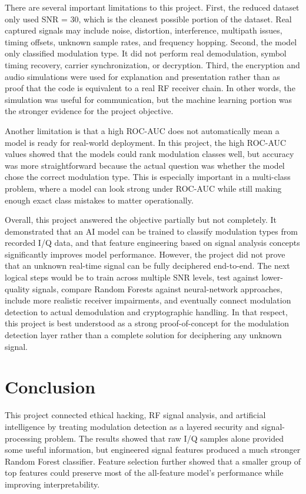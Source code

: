 \documentclass[12pt]{article}
\begin{document}
There are several important limitations to this project. First, the reduced dataset only used SNR = 30, which is the cleanest possible portion of the dataset. Real captured signals may include noise, distortion, interference, multipath issues, timing offsets, unknown sample rates, and frequency hopping. Second, the model only classified modulation type. It did not perform real demodulation, symbol timing recovery, carrier synchronization, or decryption. Third, the encryption and audio simulations were used for explanation and presentation rather than as proof that the code is equivalent to a real RF receiver chain. In other words, the simulation was useful for communication, but the machine learning portion was the stronger evidence for the project objective.

Another limitation is that a high ROC-AUC does not automatically mean a model is ready for real-world deployment. In this project, the high ROC-AUC values showed that the models could rank modulation classes well, but accuracy was more straightforward because the actual question was whether the model chose the correct modulation type. This is especially important in a multi-class problem, where a model can look strong under ROC-AUC while still making enough exact class mistakes to matter operationally.

\newpage

Overall, this project answered the objective partially but not completely. It demonstrated that an AI model can be trained to classify modulation types from recorded I/Q data, and that feature engineering based on signal analysis concepts significantly improves model performance. However, the project did not prove that an unknown real-time signal can be fully deciphered end-to-end. The next logical steps would be to train across multiple SNR levels, test against lower-quality signals, compare Random Forests against neural-network approaches, include more realistic receiver impairments, and eventually connect modulation detection to actual demodulation and cryptographic handling. In that respect, this project is best understood as a strong proof-of-concept for the modulation detection layer rather than a complete solution for deciphering any unknown signal.

\newpage

\section{Conclusion}

This project connected ethical hacking, RF signal analysis, and artificial intelligence by treating modulation detection as a layered security and signal-processing problem. The results showed that raw I/Q samples alone provided some useful information, but engineered signal features produced a much stronger Random Forest classifier. Feature selection further showed that a smaller group of top features could preserve most of the all-feature model's performance while improving interpretability.
\end{document}
